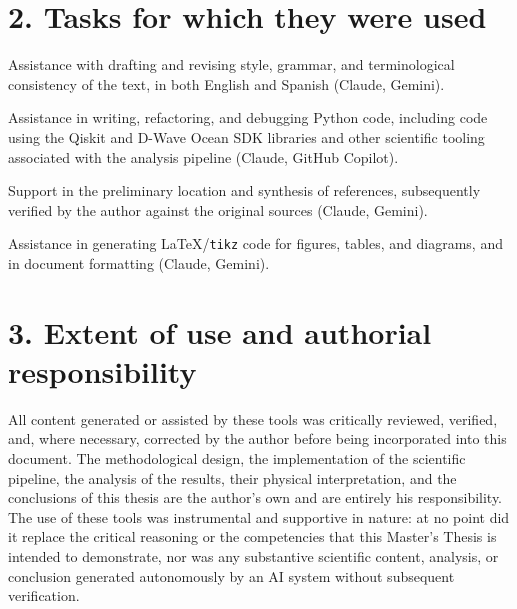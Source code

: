 \documentclass[11pt,a4paper, english]{book}
\theoremstyle{plain}
\theoremstyle{definition}
\numberwithin{equation}{chapter}
\numberwithin{figure}{chapter}
\numberwithin{table}{chapter}
\begin{document}
\section*{2. Tasks for which they were used}
\begin{description}[leftmargin=2.4cm, style=nextline]
  \item[Writing and text editing] Assistance with drafting and
    revising style, grammar, and terminological consistency of the
    text, in both English and Spanish (Claude, Gemini).
  \item[Code generation and debugging] Assistance in writing,
    refactoring, and debugging Python code, including code using the
    Qiskit and D-Wave Ocean SDK libraries and other scientific tooling
    associated with the analysis pipeline (Claude, GitHub Copilot).
  \item[Bibliographic search and synthesis] Support in the preliminary
    location and synthesis of references, subsequently verified by the
    author against the original sources (Claude, Gemini).
  \item[Figures, diagrams, and \LaTeX\ code] Assistance in generating
    \LaTeX/\texttt{tikz} code for figures, tables, and diagrams, and in
    document formatting (Claude, Gemini).
\end{description}

\section*{3. Extent of use and authorial responsibility}
All content generated or assisted by these tools was critically
reviewed, verified, and, where necessary, corrected by the author
before being incorporated into this document. The methodological
design, the implementation of the scientific pipeline, the analysis
of the results, their physical interpretation, and the conclusions of
this thesis are the author's own and are entirely his responsibility.
The use of these tools was instrumental and supportive in nature: at
no point did it replace the critical reasoning or the competencies
that this Master's Thesis is intended to demonstrate, nor was any
substantive scientific content, analysis, or conclusion generated
autonomously by an AI system without subsequent verification.
\end{document}
